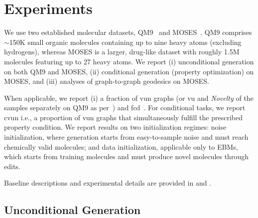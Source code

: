 \section{Experiments}
\label{sec:experiments}

We use two established molecular datasets, QM9~\cite{ramakrishnan2014qm9} and MOSES~\cite{polykovskiy2020moses}. QM9 comprises $\sim$150K small organic molecules containing up to nine heavy atoms (excluding hydrogens), whereas MOSES is a larger, drug-like dataset with roughly 1.5M molecules featuring up to 27 heavy atoms. We report (i) unconditional generation on both QM9 and MOSES, (ii) conditional generation (property optimization) on MOSES, and (iii) analyses of graph-to-graph geodesics on MOSES.

When applicable, we report (i) a fraction of \gls{vun} graphs (or \gls{vu} and \textit{Novelty} of the samples separately on QM9 as per~\citep{eijkelboom2024vfm}) and \gls{fcd}~\citep{preuer2018frechet}. For conditional tasks, we report \gls{cvun} i.e., a proportion of \gls{vun} graphs that simultaneously fulfill the prescribed property condition. We report results on two initialization regimes: noise initialization, where generation starts from easy-to-sample noise and must reach chemically valid molecules; and data initialization, applicable only to EBMs, which starts from training molecules and must produce novel molecules through edits.

%
Baseline descriptions and experimental details are provided in  and .



\subsection{Unconditional Generation}
